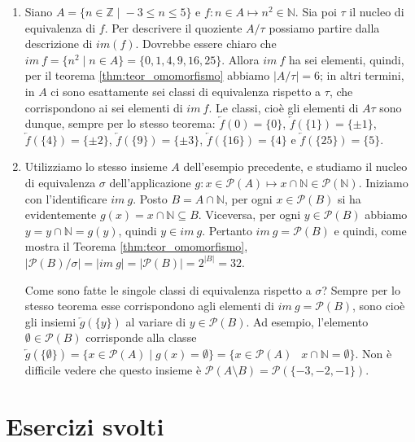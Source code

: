 \begin{example}
	\begin{enumerate}
		\item Siano $A=\{n \in \mathbb{Z} \; | \; -3 \leq n \leq 5\}$ e $f: n \in A \mapsto n^{2} \in \mathbb{N}$. Sia poi $\tau$ il nucleo di equivalenza di $f$. Per descrivere il quoziente $A/{\tau}$ possiamo partire dalla descrizione di $im(f)$. Dovrebbe essere chiaro che
		$im \ f = \{n^{2} \; | \; n \in A \} = \{0, 1, 4, 9, 16, 25\}$. Allora $im \ f$ ha sei elementi, quindi, per il teorema \ref{thm:teor_omomorfismo} abbiamo
		$|A/{\tau}| = 6$; in altri termini, in $A$ ci sono esattamente sei classi di equivalenza rispetto a $\tau$, che corrispondono	ai sei elementi di $im \ f$. Le classi, cioè gli elementi di $A{\tau}$ sono dunque, sempre per lo stesso teorema: $\overleftarrow{f}({0})=\{0\}$, $\overleftarrow{f}(\{1\})=\{\pm 1\}$, $\overleftarrow{f}(\{4\})=\{\pm 2\}$, $\overleftarrow{f}(\{9\})=\{\pm 3\}$, $\overleftarrow{f}(\{16\})=\{4\}$ e $\overleftarrow{f}(\{25\})=\{5\}$.
		\item Utilizziamo lo stesso insieme $A$ dell’esempio precedente, e studiamo il nucleo di equivalenza $\sigma$ dell'applicazione $g: x \in \mathcal{P}(A) \mapsto x \cap \mathbb{N} \in \mathcal{P}(\mathbb{N})$. Iniziamo con l'identificare $im \ g$. Posto $B=A \cap \mathbb{N}$, per ogni $x \in \mathcal{P}(B)$ si ha evidentemente $g(x) = x \cap \mathbb{N} \subseteq B$. Viceversa, per ogni $y \in \mathcal{P}(B)$ abbiamo $y= y \cap \mathbb{N} = g(y)$, quindi $y \in im \ g$. Pertanto $im \ g = \mathcal{P}(B)$ e quindi, come mostra il Teorema \ref{thm:teor_omomorfismo}, $|\mathcal{P}(B)/{\sigma}|=|im \ g| = |\mathcal{P}(B)| = 2^{|B|} = 32$.
		
		Come sono fatte le singole classi di equivalenza rispetto a $\sigma$? Sempre per lo stesso teorema esse corrispondono agli elementi di $im \ g = \mathcal{P}(B)$, sono cioè gli insiemi $\overleftarrow{g}(\{y\})$ al variare di $y \in \mathcal{P}(B)$. Ad esempio, l'elemento $\emptyset \in \mathcal{P}(B)$ corrisponde alla classe $\overleftarrow{g}(\{\emptyset\})=\{x \in \mathcal{P}(A) \; | \; g(x) = \emptyset\} = \{ x \in \mathcal{P}(A) \; \ \; x \cap \mathbb{N} = \emptyset \}$. Non è difficile vedere che questo insieme è $\mathcal{P}(A \setminus B) = \mathcal{P}(\{-3,-2,-1\})$.
	\end{enumerate}
\end{example}
\newpage

\section{Esercizi svolti}
